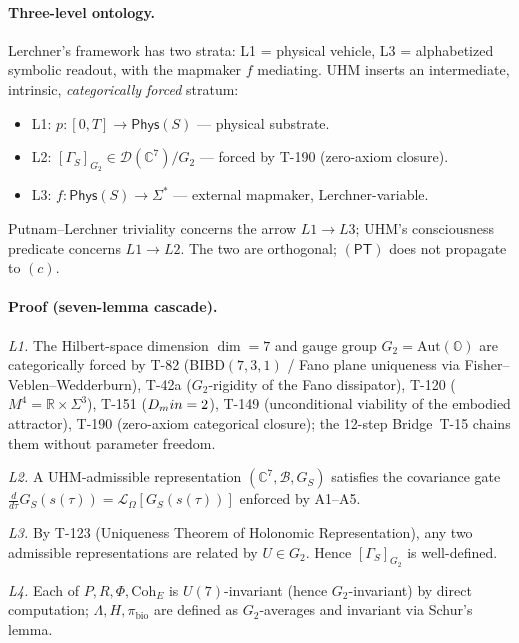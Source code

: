 \paragraph{Three-level ontology.} Lerchner's framework has two
strata: L1 = physical vehicle, L3 = alphabetized symbolic readout,
with the mapmaker $f$ mediating. UHM inserts an intermediate,
intrinsic, \emph{categorically forced} stratum:
\begin{itemize}[leftmargin=2em,nosep]
  \item L1: $p: [0,T] \to \mathsf{Phys}(S)$ --- physical substrate.
  \item L2: $[\Gamma_S]_{G_2} \in \mathcal D(\mathbb C^7)/G_2$ ---
        forced by T-190  (zero-axiom closure).
  \item L3: $f: \mathsf{Phys}(S) \to \Sigma^*$ --- external
        mapmaker, Lerchner-variable.
\end{itemize}
Putnam--Lerchner triviality concerns the arrow $L1 \to L3$; UHM's
consciousness predicate concerns $L1 \to L2$. The two are
orthogonal; $(\mathsf{PT})$ does not propagate to $(c)$.

\paragraph{Proof (seven-lemma cascade).}
\textit{L1.} The Hilbert-space dimension $\dim = 7$ and gauge
group $G_2 = \mathrm{Aut}(\mathbb O)$ are categorically forced by
T-82  (BIBD$(7,3,1)$ / Fano plane uniqueness via
Fisher--Veblen--Wedderburn), T-42a  ($G_2$-rigidity of the
Fano dissipator), T-120 
($M^4 = \mathbb R \times \Sigma^3$), T-151 
($D_min = 2$), T-149  (unconditional viability of the
embodied attractor), T-190  (zero-axiom categorical closure);
the 12-step Bridge~T-15 chains them without parameter freedom.

\textit{L2.} A UHM-admissible representation $(\mathbb C^7,
\mathcal B, G_S)$ satisfies the covariance gate $\frac{d}{d\tau}
G_S(s(\tau)) = \mathcal L_\Omega[G_S(s(\tau))]$ enforced by A1--A5.

\textit{L3.} By T-123  (Uniqueness Theorem of Holonomic
Representation), any two admissible representations are related
by $U \in G_2$. Hence $[\Gamma_S]_{G_2}$ is well-defined.

\textit{L4.} Each of $P, R, \Phi, \mathrm{Coh}_E$ is
$U(7)$-invariant (hence $G_2$-invariant) by direct computation;
$\Lambda, H, \pi_{\mathrm{bio}}$ are defined as $G_2$-averages
and invariant via Schur's lemma.

